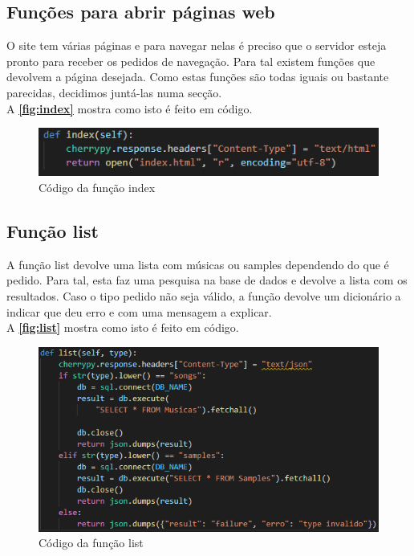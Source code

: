 \documentclass{report}
\begin{document}
\subsection{Funções para abrir páginas web}
\label{ssec:abrirWebPages}
O site tem várias páginas e para navegar nelas é preciso que o servidor esteja pronto para receber os pedidos de navegação.
Para tal existem funções que devolvem a página desejada.
Como estas funções são todas iguais ou bastante parecidas, decidimos juntá-las numa secção.\\
A \textbf{\autoref{fig:index}} mostra como isto é feito em código.

\begin{figure}[!h]
\center 
\includegraphics[width=330pt]{img/index.png}
\caption{Código da função index}
\label{fig:index}
\end{figure}

\subsection{Função list}
\label{ssec:list}
A função list devolve uma lista com músicas ou samples dependendo do que é pedido.
Para tal, esta faz uma pesquisa na base de dados e devolve a lista com os resultados.
Caso o tipo pedido não seja válido, a função devolve um dicionário a indicar que deu erro e com uma mensagem a explicar.\\
A \textbf{\autoref{fig:list}} mostra como isto é feito em código.

\begin{figure}[!h]
\center 
\includegraphics[width=330pt]{img/list.png}
\caption{Código da função list}
\label{fig:list}
\end{figure}
\end{document}
